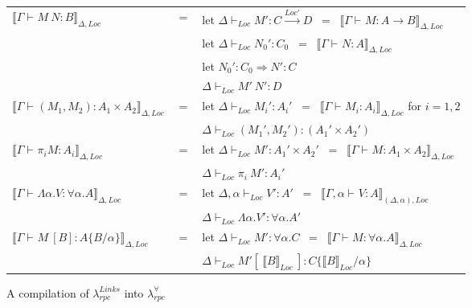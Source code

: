 \documentclass[a4paper]{article}
\theoremstyle{plain}
\theoremstyle{definition}
\newcommand{\rulewidth}{.8\linewidth}
\newcommand{\ruleverticalsephalf}{0.25cm}
\newcommand{\ruleverticalsep}{0.5cm}
\newcommand{\polyrpc}{$\lambda_{rpc}^{\forall}$\xspace}
\newcommand{\linksrpc}{$\lambda_{rpc}^{Links}$\xspace}
\newcommand{\subst}[2]{\{#1/#2\}}
\newcommand{\funL}[1]{\xrightarrow{#1}}
\newcommand{\tyenv}{\Gamma}
\newcommand{\typing}[4]{#1\vdash_{#2} #3 : #4}
\newcommand{\linkstycomp}[2]{\llbracket#1\rrbracket_{#2}}
\newcommand{\adjcomp}[4]{#1:#2 \Rightarrow #3:#4}
\newcommand{\judgcomp}[2]{\llbracket#1\rrbracket_{#2}}
\newcommand{\Loc}{Loc}
\begin{document}
\begin{figure}[h]
\begin{tabular}{l c p{\rulewidth}}
  \\[\ruleverticalsephalf]
%  
  $\judgcomp{ \typing{\tyenv}{}{M \ N }{B} }{\Delta,\Loc}$ & $=$
  & let $\typing{\Delta}{\Loc}{M'}{C \funL{\Loc'} D}$
    \ = \ $\judgcomp{ \typing{\tyenv}{}{M}{A \rightarrow B} }{\Delta,\Loc}$
  \\[\ruleverticalsephalf]
  &
  & let $\typing{\Delta}{\Loc}{N_0'}{C_0}$
    \ = \ $\judgcomp{ \typing{\tyenv}{}{N}{A} }{\Delta,\Loc}$
  \\[\ruleverticalsephalf]
  &
  & let $\adjcomp{N_0'}{C_0}{N'}{C}$
  \\[\ruleverticalsephalf]
  &
  & $\typing{\Delta}{\Loc}{M' \ N'}{D}$
  \\[\ruleverticalsep]
%  
  $\judgcomp{ \typing{\tyenv}{}{(M_1,M_2)}{A_1\times A_2} }{\Delta,\Loc}$ & $=$
  & let $\typing{\Delta}{\Loc}{M_i'}{A_i'}$
    \ = \ $\judgcomp{ \typing{\tyenv}{}{M_i}{A_i} }{\Delta,\Loc}$ for $i=1,2$
  \\[\ruleverticalsephalf]
  &
  & $\typing{\Delta}{\Loc}{(M_1',M_2')}{(A_1' \times A_2')}$
  \\[\ruleverticalsep]
%  
  $\judgcomp{ \typing{\tyenv}{}{\pi_i M}{A_i} }{\Delta,\Loc}$ & $=$
  & let $\typing{\Delta}{\Loc}{M'}{A_1' \times A_2'}$
    \ = \ $\judgcomp{ \typing{\tyenv}{}{M}{A_1\times A_2} }{\Delta,\Loc}$
  \\[\ruleverticalsephalf]
  &
  & $\typing{\Delta}{\Loc}{\pi_i \ M'}{A_i'}$
  \\[\ruleverticalsep]
%  
  $\judgcomp{ \typing{\tyenv}{}{\Lambda\alpha.V}{\forall\alpha.A} }{\Delta,\Loc}$ & $=$
  & let $\typing{\Delta,\alpha}{\Loc}{V'}{A'}$
    \ = \ $\judgcomp{ \typing{\tyenv,\alpha}{}{V}{A} }{(\Delta,\alpha),\Loc}$
  \\[\ruleverticalsephalf]
  &
  & $\typing{\Delta}{\Loc}{\Lambda\alpha.V'}{\forall\alpha.A'}$
  \\[\ruleverticalsep]
%  
  $\judgcomp{ \typing{\tyenv}{}{M \ [B]}{A\subst{B}{\alpha}} }{\Delta,\Loc}$ & $=$
  & let $\typing{\Delta}{\Loc}{M'}{\forall\alpha.C}$
    \ = \ $\judgcomp{ \typing{\tyenv}{}{M}{\forall\alpha.A} }{\Delta,\Loc}$
  \\[\ruleverticalsephalf]
  &
  & $\typing{\Delta}{\Loc}{M'[ \ \linkstycomp{B}{\Loc} \ ]}{C\subst{ \linkstycomp{B}{\Loc} }{\alpha}}$
  \\[\ruleverticalsep]
\end{tabular}
\caption{A compilation of \linksrpc into \polyrpc}
\label{fig:compilationoflinksrpc}
\end{figure}
\end{document}

